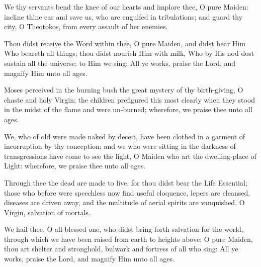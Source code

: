 \documentclass[twoside, letterpaper, 12pt]{report}
\begin{document}

We thy servants bend the knee of our hearts and implore thee, O pure Maiden:
incline thine ear and save us, who are engulfed in tribulations;
and guard thy city, O Theotokos, from every assault of her enemies.




Thou didst receive the Word within thee, O pure Maiden,
and didst bear Him Who beareth all things;
thou didst nourish Him with milk, Who by His nod dost sustain all the universe;
to Him we sing: All ye works, praise the Lord, and magnify Him unto all ages.


Moses perceived in the burning bush the great mystery of thy birth-giving,
O chaste and holy Virgin;
the children prefigured this most clearly
when they stood in the midst of the flame and were un-burned;
wherefore, we praise thee unto all ages.


We, who of old were made naked by deceit,
have been clothed in a garment of incorruption by thy conception;
and we who were sitting in the darkness of transgressions
have come to see the light,
O Maiden who art the dwelling-place of Light:
wherefore, we praise thee unto all ages.


Through thee the dead are made to live, for thou didst bear the Life Essential;
those who before were speechless now find useful eloquence,
lepers are cleansed, diseases are driven away,
and the multitude of aerial spirits are vanquished,
O Virgin, salvation of mortals.


We hail thee, O all-blessed one,
who didst bring forth salvation for the world,
through which we have been raised from earth to heights above;
O pure Maiden, thou art shelter and stronghold,
bulwark and fortress of all who sing:
All ye works, praise the Lord, and magnify Him unto all ages.
\end{document}

